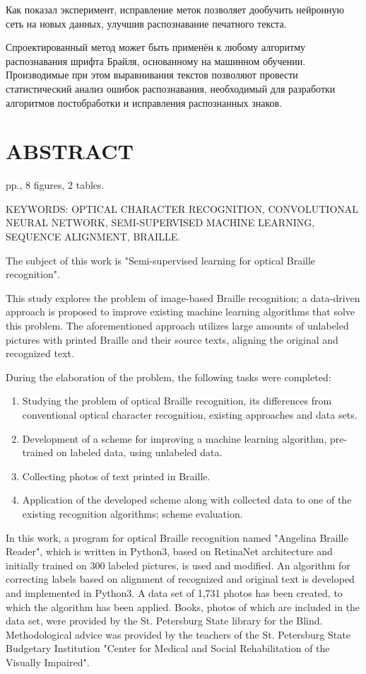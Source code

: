 \documentclass{main.tex}[subfiles]
\begin{document}
Как показал эксперимент, исправление меток позволяет дообучить нейронную сеть на новых данных, улучшив распознавание печатного текста.

Спроектированный метод может быть применён к любому алгоритму распознавания шрифта Брайля, основанному на машинном обучении.
Производимые при этом выравнивания текстов позволяют провести статистический анализ ошибок распознавания, необходимый для разработки алгоритмов постобработки и исправления распознанных знаков.

\newpage
\thispagestyle{empty}
\section*{ABSTRACT}

\pageref*{LastPage} pp., 8 figures, 2 tables.

KEYWORDS: OPTICAL CHARACTER RECOGNITION, CONVOLUTIONAL\\
\noindent NEU\-RAL NETWORK, SEMI-SUPERVISED MACHINE LEARNING, SE\-QUENCE ALIGN\-MENT, BRAILLE.

The subject of this work is "Semi-supervised learning for optical Braille recog\-ni\-ti\-on".

This study explores the problem of image-based Braille recognition; a data-driven approach is proposed to improve existing machine learning algorithms that solve this problem.
The aforementioned approach utilizes large amounts of unlabeled pictures with printed Braille and their source texts, aligning the original and recognized text.

During the elaboration of the problem, the following tasks were completed:
\begin{enumerate}[noitemsep]
    \item Studying the problem of optical Braille recognition, its differences from con\-ven\-ti\-o\-nal optical character recognition, existing approaches and data sets.
    \item Development of a scheme for improving a machine learning algorithm, pre-trained on labeled data, using unlabeled data.
    \item Collecting photos of text printed in Braille.
    \item Application of the developed scheme along with collected data to one of the existing recognition algorithms; scheme evaluation.
\end{enumerate}

In this work, a program for optical Braille recognition named "Angelina Braille Reader"\hspace{0pt}, which is written in Python3, based on Retina\-Net architecture and initially trained on 300 labeled pictures, is used and modified.
An algorithm for correcting labels based on alignment of recognized and original text is developed and implemented in Python3.
A data set of 1,731 photos has been created, to which the algorithm has been applied.
Books, photos of which are included in the data set, were provided by the St. Petersburg State library for the Blind.
Methodological advice was provided by the teachers of the St. Petersburg State Budgetary Institution "Center for Medical and Social Rehabilitation of the Visually Impaired".
\end{document}
